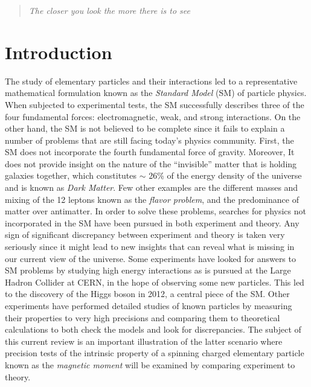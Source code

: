 \documentclass{outhesis}
\begin{document}
\frontmatter

\maketitle

\mainmatter


\begin{quote}
\hfill \emph{The closer you look the more there is to see} \cite{book}
\end{quote}


\section{Introduction}
\label{sec:intro}

The study of elementary particles and their interactions led to a representative mathematical formulation known as the \emph{Standard Model} (SM) of particle physics. When subjected to experimental tests, the SM successfully describes three of the four fundamental forces: electromagnetic, weak, and strong interactions. On the other hand, the SM is not believed to be complete since it fails to explain a number of problems that are still facing today's physics community. First, the SM does not incorporate the fourth fundamental force of gravity. Moreover, It does not provide insight on the nature of the ``invisible'' matter that is holding galaxies together, which constitutes $\sim$ 26\% of the energy density of the universe and is known as \emph{Dark Matter}. Few other examples are the different masses and mixing of the 12 leptons
 known as the \emph{flavor problem}, and the predominance of matter over antimatter. In order to solve these problems, searches for physics not incorporated in the SM have been pursued in both experiment and theory. Any sign of significant discrepancy between experiment and theory is taken very seriously since it might lead to new insights that can reveal what is missing in our current view of the universe. Some experiments have looked for answers to SM problems by studying high energy interactions as is pursued at the Large Hadron Collider at CERN, in the hope of observing some new particles. This led to the discovery of the Higgs boson in 2012, a central piece of the SM. Other experiments have performed detailed studies of known particles by measuring their properties to very high precisions and comparing them to theoretical calculations to both check the models and look for discrepancies. The subject of this current review is an important illustration of the latter scenario where precision tests of the intrinsic property of a spinning charged elementary particle known as the \emph{magnetic moment} will be examined by comparing experiment to theory.
\end{document}
